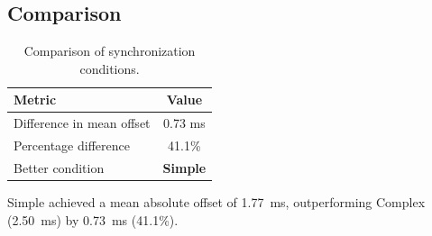 \subsection*{Comparison}

\begin{table}[h!]
\centering
\begin{tabular}{|l|c|}
\hline
Metric & Value \\
\hline
Difference in mean offset & 0.73 ms \\
Percentage difference & 41.1\% \\
Better condition & \textbf{Simple} \\
\hline
\end{tabular}
\caption{Comparison of synchronization conditions.}
\label{tab:sync_comparison}
\end{table}

Simple achieved a mean absolute offset of 1.77~ms, outperforming Complex (2.50~ms) by 0.73~ms (41.1\%).
